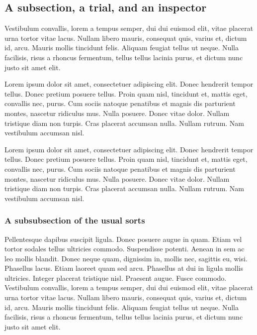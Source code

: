 \documentclass{hacett-socsci-thesis}
\begin{document}
\subsection{A subsection, a trial, and an inspector}

Vestibulum convallis, lorem a tempus semper, dui dui euismod elit,
vitae placerat urna tortor vitae lacus.  Nullam libero mauris,
consequat quis, varius et, dictum id, arcu.  Mauris mollis tincidunt
felis.  Aliquam feugiat tellus ut neque.  Nulla facilisis, risus a
rhoncus fermentum, tellus tellus lacinia purus, et dictum nunc justo
sit amet elit.

Lorem ipsum dolor sit amet, consectetuer adipiscing elit.  Donec
hendrerit tempor tellus.  Donec pretium posuere tellus.  Proin quam
nisl, tincidunt et, mattis eget, convallis nec, purus.  Cum sociis
natoque penatibus et magnis dis parturient montes, nascetur ridiculus
mus.  Nulla posuere.  Donec vitae dolor.  Nullam tristique diam non
turpis.  Cras placerat accumsan nulla.  Nullam rutrum.  Nam vestibulum
accumsan nisl.

Lorem ipsum dolor sit amet, consectetuer adipiscing elit.  Donec
hendrerit tempor tellus.  Donec pretium posuere tellus.  Proin quam
nisl, tincidunt et, mattis eget, convallis nec, purus.  Cum sociis
natoque penatibus et magnis dis parturient montes, nascetur ridiculus
mus.  Nulla posuere.  Donec vitae dolor.  Nullam tristique diam non
turpis.  Cras placerat accumsan nulla.  Nullam rutrum.  Nam vestibulum
accumsan nisl.

\subsubsection{A subsubsection of the usual sorts}

Pellentesque dapibus suscipit ligula.  Donec posuere augue in quam.
Etiam vel tortor sodales tellus ultricies commodo.  Suspendisse
potenti.  Aenean in sem ac leo mollis blandit.  Donec neque quam,
dignissim in, mollis nec, sagittis eu, wisi.  Phasellus lacus.  Etiam
laoreet quam sed arcu.  Phasellus at dui in ligula mollis ultricies.
Integer placerat tristique nisl.  Praesent augue.  Fusce commodo.
Vestibulum convallis, lorem a tempus semper, dui dui euismod elit,
vitae placerat urna tortor vitae lacus.  Nullam libero mauris,
consequat quis, varius et, dictum id, arcu.  Mauris mollis tincidunt
felis.  Aliquam feugiat tellus ut neque.  Nulla facilisis, risus a
rhoncus fermentum, tellus tellus lacinia purus, et dictum nunc justo
sit amet elit.
\end{document}
